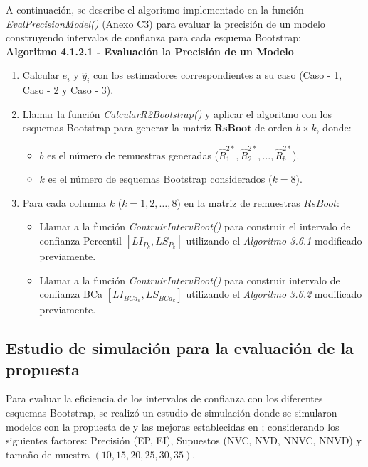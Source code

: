 A continuación, se describe el algoritmo implementado en la función \textit{EvalPrecisionModel()} (Anexo C3) para evaluar la precisión de un modelo construyendo intervalos de confianza para cada esquema Bootstrap:\\


\textbf{Algoritmo 4.1.2.1 - Evaluación la Precisión de un Modelo}

\begin{enumerate}
	
	\item Calcular $e_i$ y $\hat{y}_{i}$ con los estimadores correspondientes a su caso (Caso - 1, Caso - 2 y Caso - 3).
	
	\item Llamar la función \textit{CalcularR2Bootstrap()} y aplicar el algoritmo con los esquemas Bootstrap para generar la matriz \( \mathbf{RsBoot} \) de orden \( b \times k \), donde:
	\begin{itemize}
		\item \( b \) es el número de remuestras generadas (\( \hat{R}^{2*}_{1}, \hat{R}^{2*}_{2}, \dots, \hat{R}^{2*}_{b} \)).
		\item \( k \) es el número de esquemas Bootstrap considerados (\( k = 8 \)).
	\end{itemize}
	
	\item Para cada columna \( k \) (\( k = 1, 2, \dots, 8 \)) en la matriz de remuestras \( RsBoot \):
	\begin{itemize}
		\item  Llamar a la función \textit{ContruirIntervBoot()} para construir el intervalo de confianza Percentil \( [LI_{P_k}, LS_{P_k}] \) utilizando el \textit{Algoritmo 3.6.1} modificado previamente.
		\item Llamar a la función \textit{ContruirIntervBoot()} para construir intervalo de confianza BCa \( [LI_{BCa_k}, LS_{BCa_k}] \) utilizando el \textit{Algoritmo 3.6.2} modificado previamente.
	\end{itemize}
\end{enumerate}





	 
\subsection{Estudio de simulación para la evaluación de la propuesta}

Para evaluar la eficiencia de los intervalos de confianza con los diferentes esquemas Bootstrap, se realizó un estudio de simulación donde se simularon modelos con la propuesta de \textcite{febles-2014} y las mejoras establecidas en \textcite{zacarias-2023}; considerando los siguientes factores: Precisión (EP, EI), Supuestos (NVC, NVD, NNVC, NNVD) y tamaño de muestra $(10, 15, 20, 25, 30, 35)$.\\


